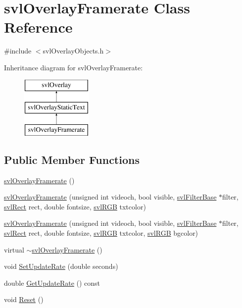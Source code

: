 \hypertarget{classsvl_overlay_framerate}{\section{svl\-Overlay\-Framerate Class Reference}
\label{classsvl_overlay_framerate}
}


{\ttfamily \#include $<$svl\-Overlay\-Objects.\-h$>$}

Inheritance diagram for svl\-Overlay\-Framerate\-:\begin{figure}[H]
\begin{center}
\leavevmode
\includegraphics[height=3.000000cm]{d8/d37/classsvl_overlay_framerate}
\end{center}
\end{figure}
\subsection*{Public Member Functions}
\begin{DoxyCompactItemize}
\item 
\hyperlink{classsvl_overlay_framerate_a37588edc37a46d34f272f566f4086ceb}{svl\-Overlay\-Framerate} ()
\item 
\hyperlink{classsvl_overlay_framerate_a6756410e02a4ffdc1952fbb1d48725fe}{svl\-Overlay\-Framerate} (unsigned int videoch, bool visible, \hyperlink{classsvl_filter_base}{svl\-Filter\-Base} $\ast$filter, \hyperlink{structsvl_rect}{svl\-Rect} rect, double fontsize, \hyperlink{structsvl_r_g_b}{svl\-R\-G\-B} txtcolor)
\item 
\hyperlink{classsvl_overlay_framerate_ad8db9b32332556ec59a61cc41021e2b7}{svl\-Overlay\-Framerate} (unsigned int videoch, bool visible, \hyperlink{classsvl_filter_base}{svl\-Filter\-Base} $\ast$filter, \hyperlink{structsvl_rect}{svl\-Rect} rect, double fontsize, \hyperlink{structsvl_r_g_b}{svl\-R\-G\-B} txtcolor, \hyperlink{structsvl_r_g_b}{svl\-R\-G\-B} bgcolor)
\item 
virtual \hyperlink{classsvl_overlay_framerate_aa947a1d99a89140062b28af12af80f7f}{$\sim$svl\-Overlay\-Framerate} ()
\item 
void \hyperlink{classsvl_overlay_framerate_a2400320400efe0226acfdf6540e19932}{Set\-Update\-Rate} (double seconds)
\item 
double \hyperlink{classsvl_overlay_framerate_acd58f29e77f6082470d478aa931c45fd}{Get\-Update\-Rate} () const 
\item 
void \hyperlink{classsvl_overlay_framerate_af9968d96022ac978a8e5408b6193fe45}{Reset} ()
\end{DoxyCompactItemize}
